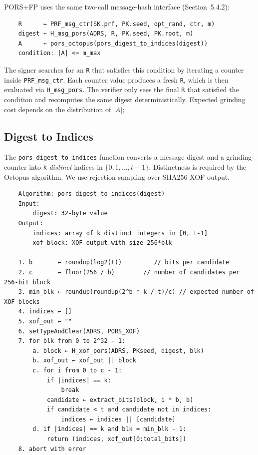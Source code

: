 PORS+FP uses the same two-call message-hash interface (Section~5.4.2):
\begin{verbatim}
    R      ← PRF_msg_ctr(SK.prf, PK.seed, opt_rand, ctr, m)
    digest ← H_msg_pors(ADRS, R, PK.seed, PK.root, m)
    A      ← pors_octopus(pors_digest_to_indices(digest))
    condition: |A| <= m_max
\end{verbatim}
 
The signer searches for an \texttt{R} that satisfies this condition by
iterating a counter inside \texttt{PRF\_msg\_ctr}. Each counter value produces
a fresh \texttt{R}, which is then evaluated via \texttt{H\_msg\_pors}. The
verifier only sees the final \texttt{R} that satisfied the condition and
recomputes the same digest deterministically. Expected grinding cost depends on the distribution of $|A|$; 

\subsection{Digest to Indices}
\label{subsec:pors_digest_to_indices}
 
The \texttt{pors\_digest\_to\_indices} function converts a message digest and a grinding
counter into \texttt{k} \emph{distinct} indices in $\{0,1,...,t-1\}$. Distinctness is required by the Octopus
algorithm. We use rejection sampling over SHA256 XOF output.
 
\begin{verbatim}
    Algorithm: pors_digest_to_indices(digest)
    Input:
        digest: 32-byte value
    Output:
        indices: array of k distinct integers in [0, t-1]
        xof_block: XOF output with size 256*blk

    1. b       ← roundup(log2(t))         // bits per candidate
    2. c       ← floor(256 / b)        // number of candidates per 256-bit block
    3. min_blk ← roundup(roundup(2^b * k / t)/c) // expected number of XOF blocks
    4. indices ← []
    5. xof_out ← ""
    6. setTypeAndClear(ADRS, PORS_XOF)
    7. for blk from 0 to 2^32 - 1:
        a. block ← H_xof_pors(ADRS, PKseed, digest, blk)
        b. xof_out ← xof_out || block
        c. for i from 0 to c - 1:
            if |indices| == k:
                break
            candidate ← extract_bits(block, i * b, b)
            if candidate < t and candidate not in indices:
                indices ← indices || [candidate]
        d. if |indices| == k and blk = min_blk - 1:
            return (indices, xof_out[0:total_bits])
    8. abort with error
\end{verbatim}

